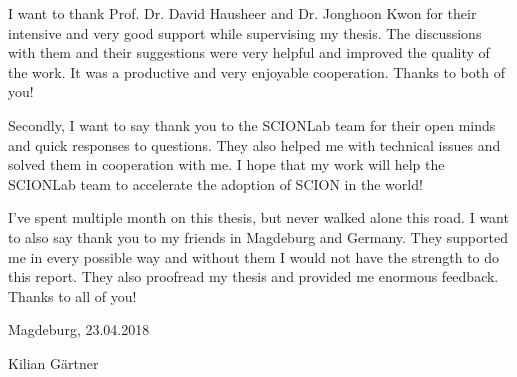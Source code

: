 \documentclass[thesis.tex]{subfiles}
\begin{document}
\label{chap:Acknowledgments}

I want to thank Prof. Dr. David Hausheer and Dr. Jonghoon Kwon for their intensive and very good support while supervising my thesis. The discussions with them and their suggestions were very helpful and improved the quality of the work. It was a productive and very enjoyable cooperation. Thanks to both of you!

Secondly, I want to say thank you to the SCIONLab team for their open minds and quick responses to questions. They also helped me with technical issues and solved them in cooperation with me. I hope that my work will help the SCIONLab team to accelerate the adoption of SCION in the world!

I've spent multiple month on this thesis, but never walked alone this road. I want to also say thank you to my friends in Magdeburg and Germany. They supported me in every possible way and without them I would not have the strength to do this report. They also proofread my thesis and provided me enormous feedback. Thanks to all of you!

\vspace{1cm}
Magdeburg, 23.04.2018

\vspace{5mm}
Kilian G\"{a}rtner
\newpage
\end{document}

